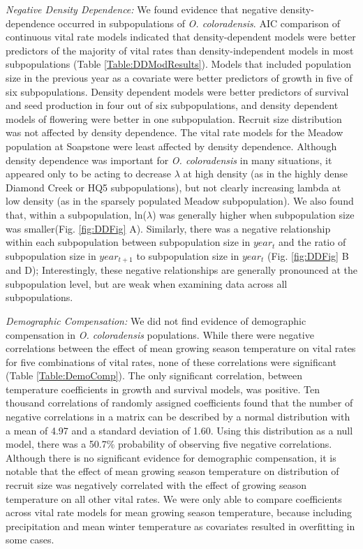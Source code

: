 \documentclass[12pt, letterpaper]{article}
\begin{document}
\textit{Negative Density Dependence:} We found evidence that negative density-dependence occurred in subpopulations of \textit{O. coloradensis}. AIC comparison of continuous vital rate models indicated that density-dependent models were better predictors of the majority of vital rates than density-independent models in most subpopulations (Table \ref{Table:DDModResults}).  Models that included population size in the previous year as a covariate were better predictors of growth in five of six subpopulations. Density dependent models were better predictors of survival and seed production in four out of six subpopulations, and density dependent models of flowering were better in one subpopulation. Recruit size distribution was not affected by density dependence. The vital rate models for the Meadow population at Soapstone were least affected by density dependence. Although density dependence was important for \textit{O. coloradensis} in many situations, it appeared only to be acting to decrease $\lambda$ at high density (as in the highly dense Diamond Creek or HQ5 subpopulations), but not clearly increasing lambda at low density (as in the sparsely populated Meadow subpopulation). We also found that, within a subpopulation, ln($\lambda$) was generally higher when subpopulation size was smaller(Fig. \ref{fig:DDFig} A). Similarly, there was a negative relationship within each subpopulation between subpopulation size in $year_{t}$ and the ratio of subpopulation size in $year_{t+1}$ to subpopulation size in $year_{t}$ (Fig. \ref{fig:DDFig} B and D); Interestingly, these negative relationships are generally pronounced at the subpopulation level, but are weak when examining data across all subpopulations. 

\textit{Demographic Compensation:} We did not find evidence of demographic compensation in \textit{O. coloradensis} populations. While there were negative correlations between the effect of mean growing season temperature on vital rates for five combinations of vital rates, none of these correlations were significant (Table \ref{Table:DemoComp}). The only significant correlation, between temperature coefficients in growth and survival models, was positive. Ten thousand correlations of randomly assigned coefficients found that the number of negative correlations in a matrix can be described by a normal distribution with a mean of 4.97 and a standard deviation of 1.60. Using this distribution as a null model, there was a 50.7\% probability of observing five negative correlations. Although there is no significant evidence for demographic compensation, it is notable that the effect of mean growing season temperature on distribution of recruit size was negatively correlated with the effect of growing season temperature on all other vital rates. We were only able to compare coefficients across vital rate models for mean growing season temperature, because including precipitation and mean winter temperature as covariates resulted in overfitting in some cases.  
\end{document}
